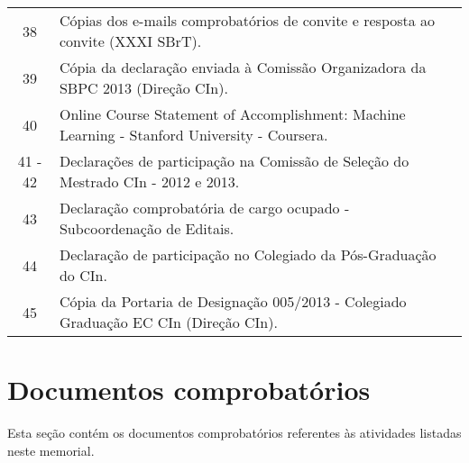 \documentclass[a4paper,oneside,10pt]{article}
\newcounter{document}%
\begin{document}
\begin{table}[h]
\begin{tabular}{cl}
  38 & C\'{o}pias dos e-mails comprobat\'{o}rios de convite e resposta ao convite (XXXI SBrT). \\
  39 & C\'{o}pia da declara\c{c}\~{a}o enviada \`{a} Comiss\~{a}o Organizadora da SBPC 2013 (Dire\c{c}\~{a}o CIn). \\
  40 & Online Course Statement of Accomplishment: Machine Learning - Stanford University - Coursera. \\
  41 - 42 & Declara\c{c}\~{o}es de participa\c{c}\~{a}o na Comiss\~{a}o de Sele\c{c}\~{a}o do Mestrado CIn - 2012 e 2013. \\
  43 & Declara\c{c}\~{a}o comprobat\'{o}ria de cargo ocupado - Subcoordena\c{c}\~{a}o de Editais. \\
  44 & Declara\c{c}\~{a}o de participa\c{c}\~{a}o no Colegiado da P\'{o}s-Gradua\c{c}\~{a}o do CIn. \\
  45 & C\'{o}pia da Portaria de Designa\c{c}\~{a}o 005/2013 - Colegiado Gradua\c{c}\~{a}o EC CIn (Dire\c{c}\~{a}o CIn). \\
\bottomrule
\end{tabular}
\label{Tab:ListaAnexos}
\end{table}

\clearpage
\appendix
\newpage
\section{Documentos comprobatórios}
Esta seção contém os documentos comprobatórios referentes às atividades listadas neste memorial.
\renewcommand{\thesubsection}{\arabic{subsection}}


\end{document}
